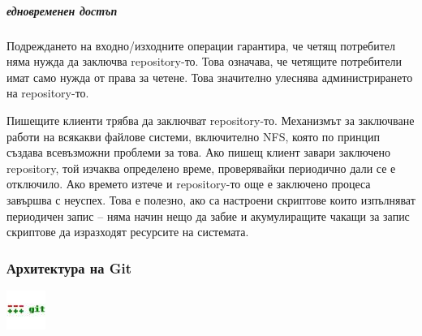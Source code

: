 \documentclass[a4paper]{article}
\begin{document}
      \subparagraph{едновременен достъп}
      Подреждането на входно/изходните операции гарантира, че четящ потребител
      няма нужда да заключва repository-то. Това означава, че четящите
      потребители имат само нужда от права за четене. Това значително улеснява
      администрирането на repository-то.

      Пишещите клиенти трябва да заключват repository-то. Механизмът за
      заключване работи на всякакви файлове системи, включително NFS\cite{nfs},
      която по принцип създава всевъзможни проблеми за това. Ако пишещ клиент
      завари заключено repository, той изчаква определено време, проверявайки
      периодично дали се е отключило. Ако времето изтече и repository-то още
      е заключено процеса завършва с неуспех. Това е полезно, ако са настроени
      скриптове които изпълняват периодичен запис -- няма начин нещо да забие
      и акумулиращите чакащи за запис скриптове да изразходят ресурсите на
      системата.

    \subsubsection{Архитектура на Git}
    \includegraphics[scale=1.0]{git_icon}
\end{document}
